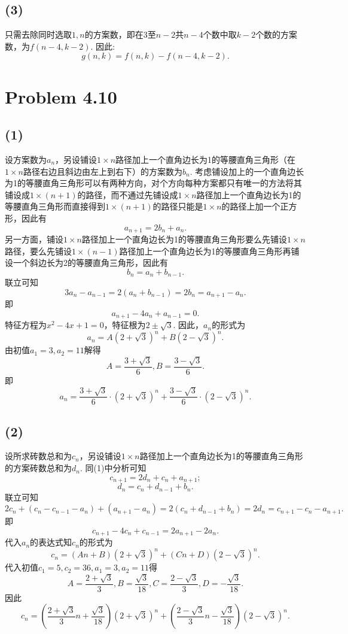 \documentclass{article}
\begin{document}
\subsection*{(3)}
只需去除同时选取$1,n$的方案数，即在$3$至$n-2$共$n-4$个数中取$k-2$个数的方案数，为$f(n-4,k-2)$. 因此:
\[g(n,k)=f(n,k)-f(n-4,k-2).\]


\section*{Problem 4.10}
\subsection*{(1)}
设方案数为$a_n$，另设铺设$1\times n$路径加上一个直角边长为1的等腰直角三角形（在$1\times n$路径右边且斜边由左上到右下）的方案数为$b_n$. 考虑铺设加上的一个直角边长为1的等腰直角三角形可以有两种方向，对个方向每种方案都只有唯一的方法将其铺设成$1\times (n+1)$的路径，而不通过先铺设成$1\times n$路径加上一个直角边长为1的等腰直角三角形而直接得到$1\times (n+1)$的路径只能是$1\times n$的路径上加一个正方形，因此有
\[a_{n+1}=2b_n+a_n.\]
另一方面，铺设$1\times n$路径加上一个直角边长为1的等腰直角三角形要么先铺设$1\times n$路径，要么先铺设$1\times (n-1)$路径加上一个直角边长为1的等腰直角三角形再铺设一个斜边长为2的等腰直角三角形，因此有
\[b_n=a_n+b_{n-1}.\]
联立可知
\[3a_n-a_{n-1}=2(a_n+b_{n-1})=2b_{n}=a_{n+1}-a_{n}.\]
即\[a_{n+1}-4a_n+a_{n-1}=0.\]
特征方程为$x^2-4x+1=0$，特征根为$2\pm \sqrt{3}$. 因此，$a_n$的形式为
\[a_n=A(2+\sqrt{3})^n+B(2-\sqrt{3})^n.\]
由初值$a_1=3,a_2=11$解得
\[A=\frac{3+\sqrt{3}}{6},B=\frac{3-\sqrt{3}}{6}.\]
即
\[a_n=\frac{3+\sqrt{3}}{6}\cdot (2+\sqrt{3})^n+\frac{3-\sqrt{3}}{6}\cdot(2-\sqrt{3})^n.\]

\subsection*{(2)}
设所求砖数总和为$c_n$，另设铺设$1\times n$路径加上一个直角边长为1的等腰直角三角形的方案砖数总和为$d_n$. 同(1)中分析可知
\[c_{n+1}=2d_n+c_n+a_{n+1};\]
\[d_n=c_n+d_{n-1}+b_n.\]
联立可知
\[2c_n+(c_n-c_{n-1}-a_n)+(a_{n+1}-a_{n})=2(c_n+d_{n-1}+b_n)=2d_{n}=c_{n+1}-c_{n}-a_{n+1}.\]
即\[c_{n+1}-4c_n+c_{n-1}=2a_{n+1}-2a_n.\]
代入$a_n$的表达式知$c_n$的形式为
\[c_n=(An+B)(2+\sqrt{3})^n+(Cn+D)(2-\sqrt{3})^n.\]
代入初值$c_1=5,c_2=36,a_1=3,a_2=11$得
\[A=\frac{2+\sqrt{3}}{3},B=\frac{\sqrt{3}}{18},C=\frac{2-\sqrt{3}}{3},D=-\frac{\sqrt{3}}{18}.\]
因此
\[c_n=\left(\frac{2+\sqrt{3}}{3}n+\frac{\sqrt{3}}{18}\right)(2+\sqrt{3})^n+\left(\frac{2-\sqrt{3}}{3}n-\frac{\sqrt{3}}{18}\right)(2-\sqrt{3})^n.\]
                                                                                                                                               
\end{document}
